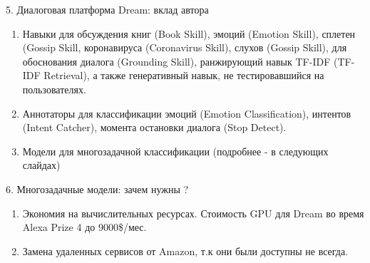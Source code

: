\begin{frame}{5. Диалоговая платформа Dream: вклад автора}
\begin{enumerate}
 \item Навыки для обсуждения книг (Book Skill), эмоций (Emotion Skill), сплетен (Gossip Skill, коронавируса (Coronavirus Skill), слухов (Gossip Skill), для обоснования диалога (Grounding Skill), ранжирующий навык TF-IDF (TF-IDF Retrieval), а также генеративный навык, не тестировавшийся на пользователях.
 \item Аннотаторы для классификации эмоций (Emotion Classification), интентов (Intent Catcher), момента остановки диалога (Stop Detect).
 \item Модели для многозадачной классификации (подробнее - в следующих слайдах)
\end{enumerate}
\end{frame}
\begin{frame}{6. Многозадачные модели: зачем нужны ?}
\begin{enumerate}
\item Экономия на вычислительных ресурсах. Стоимость GPU для Dream во время Alexa Prize 4 до 9000\$/мес.
\item Замена удаленных сервисов от Amazon, т.к они были доступны не всегда.
\end{enumerate}
\end{frame}

